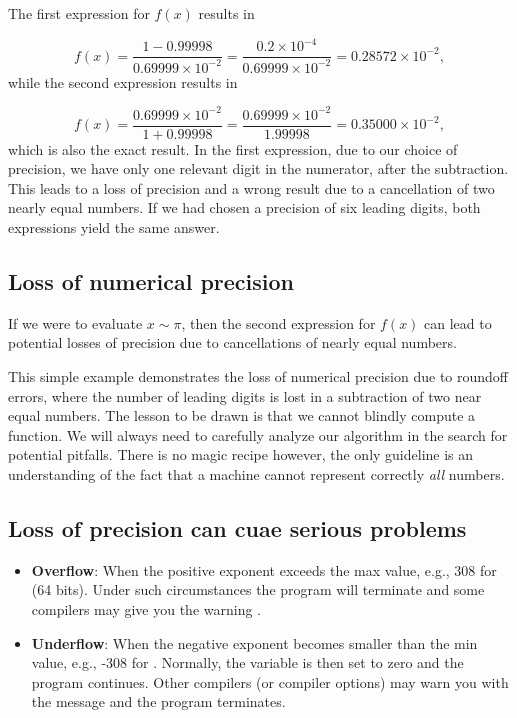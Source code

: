 \documentclass[%
twoside,                 %
final,                   %
10pt]{article}
\newenvironment{block_mdfboxadmon}[1][]{
\begin{block_mdfboxmdframed}[frametitle=#1]
}
{
\end{block_mdfboxmdframed}
}
\begin{document}
The first expression for $f(x)$ results in

\[
   f(x)=\frac{1-0.99998}{0.69999\times 10^{-2}}=\frac{0.2\times 10^{-4}}{0.69999\times 10^{-2}}=0.28572\times 10^{-2},
\]
while the second expression results in

\[
   f(x)=\frac{0.69999\times 10^{-2}}{1+0.99998}=
\frac{0.69999\times 10^{-2}}{1.99998}=0.35000\times 10^{-2},
\]
which is also the exact result. In the first expression, due to our
choice of precision, we have
only one relevant digit in the numerator, after the
subtraction. This leads to a loss of precision and a wrong result due to
a cancellation of two nearly equal numbers.
If we had chosen a precision of six leading digits, both expressions
yield the same answer.

\subsection{Loss of numerical precision}

If we were to evaluate $x\sim \pi$, then the second expression for $f(x)$
can lead to potential losses of precision due to cancellations of nearly
equal numbers.

This simple example demonstrates  the loss of numerical precision due
to roundoff errors, where the number of leading digits is lost
in a subtraction of two near equal numbers.
The lesson to be drawn is that we cannot blindly compute a function.
We will always need to carefully analyze our algorithm in the search for
potential pitfalls. There is no magic recipe however, the only guideline
is an understanding of the fact that a machine cannot represent
correctly \emph{all} numbers.

\subsection{Loss of precision can cuae serious problems}


\begin{block_mdfboxadmon}

\begin{itemize}
  \item \textbf{Overflow}: When the positive exponent exceeds the max value, e.g., 308 for  (64 bits). Under such circumstances the program will terminate and some compilers may give you the warning .

  \item \textbf{Underflow}: When the negative exponent becomes smaller than the min value, e.g., -308 for . Normally, the variable is then set to zero and the program continues. Other compilers (or compiler options) may warn you with the  message and the program terminates.
\end{itemize}

\noindent
\end{block_mdfboxadmon}
\end{document}
